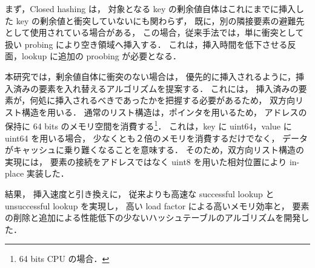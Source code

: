 まず，Closed hashing は，
対象となる key の剰余値自体はこれにまでに挿入した key の剰余値と衝突していないにも関わらず，
既に，別の隣接要素の避難先として使用されている場合がある，
この場合，従来手法では，単に衝突として扱い probing により空き領域へ挿入する．
これは，挿入時間を低下させる反面，lookup に追加の proobing が必要となる．

本研究では，剰余値自体に衝突のない場合は，
優先的に挿入されるように，挿入済みの要素を入れ替えるアルゴリズムを提案する．
これには，
挿入済みの要素が，何処に挿入されるべきであったかを把握する必要があるため，
双方向リスト構造を用いる．
通常のリスト構造は，ポインタを用いるため，
アドレスの保持に 64 bits のメモリ空間を消費する\footnote{64 bits CPU の場合．}．
これは，key に uint64，value に uint64 を用いる場合，
少なくとも２倍のメモリを消費するだけでなく，
データがキャッシュに乗り難くなることを意味する．
そのため，双方向リスト構造の実現には，
要素の接続をアドレスではなく uint8 を用いた相対位置により in-place 実装した．

結果，
挿入速度と引き換えに，
従来よりも高速な successful lookup と unsuccessful lookup を実現し，
高い load factor による高いメモリ効率と，
要素の削除と追加による性能低下の少ないハッシュテーブルのアルゴリズムを開発した．






